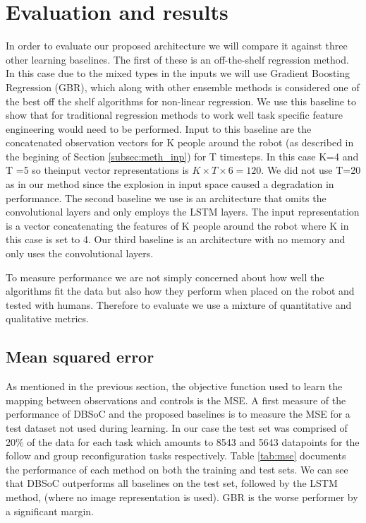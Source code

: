 \documentclass[letterpaper, 10 pt, conference]{ieeeconf}
\begin{document}
\section{Evaluation and results}
In order to evaluate our proposed architecture we will compare it against three other learning baselines. The first of these is an off-the-shelf regression method. In this case due to the mixed types in the inputs we will use Gradient Boosting Regression (GBR), which along with other ensemble methods is considered one of the best off the shelf algorithms for non-linear regression. We use this baseline to show that for traditional regression methods to work well task specific feature engineering would need to be performed. Input to this baseline are the concatenated observation vectors for K people around the robot (as described in the begining of Section \ref{subsec:meth_inp}) for T timesteps. In this case K=4 and T =5 so theinput vector representations is $K\times T \times 6 = 120$. We did not use T=20 as in our method since the explosion in input space caused a degradation in performance. The second baseline we use is an architecture that omits the convolutional layers and only employs the LSTM layers. The input representation is a vector concatenating the features of K people around the robot where K in this case is set to 4. Our third baseline is an architecture with no memory and only uses the convolutional layers.

To measure performance we are not simply concerned about how well the algorithms fit the data but also how they perform when placed on the robot and tested with humans. Therefore to evaluate we use a mixture of quantitative and qualitative metrics. 

\subsection{Mean squared error}
As mentioned in the previous section, the objective function used to learn the mapping between observations and controls is the MSE. A first measure of the performance of DBSoC and the proposed baselines is to measure the MSE for a test dataset not used during learning. In our case the test set was comprised of 20\% of the data for each task which amounts to 8543 and 5643 datapoints for the follow and group reconfiguration tasks respectively. Table \ref{tab:mse} documents the performance of each method on both the training and test sets. We can see that DBSoC outperforms all baselines on the test set, followed by the LSTM method, (where no image representation is used). GBR is the worse performer by a significant margin.
\end{document}
